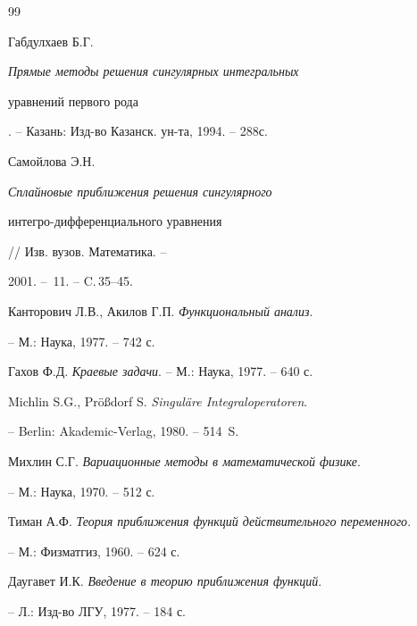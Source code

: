 \begin{thebibliography}{99}


Габдулхаев Б.Г. {\em Прямые методы решения сингулярных интегральных 


уравнений первого рода}. -- Казань: Изд-во Казанск. ун-та, 1994. -- 288с.




Самойлова Э.Н. {\em Сплайновые приближения решения сингулярного 


интегро-дифференциального уравнения} // Изв. вузов. Математика. --


2001. -- \No\,11. -- C.\,35--45.




Канторович Л.В., Акилов Г.П. {\em Функциональный анализ}.


-- М.: Наука, 1977. -- 742 с.




Гахов Ф.Д. {\em Краевые задачи}. -- М.: Наука, 1977. -- 640 с.




Michlin S.G., Pr\"o\ss{}dorf S. {\em Singul\"are Integraloperatoren}.


-- Berlin: Akademic-Verlag, 1980. -- 514~S.




Михлин С.Г. {\em Вариационные методы в математической физике}.


-- М.: Наука, 1970. -- 512 с.




Тиман А.Ф. {\em Теория приближения функций действительного переменного}.


-- М.: Физматгиз, 1960. -- 624 с.




Даугавет И.К. {\em Введение в теорию приближения функций}.


-- Л.: Изд-во ЛГУ, 1977. -- 184 с.





\end{thebibliography}





\vskip 0.5cm












\label{end}





